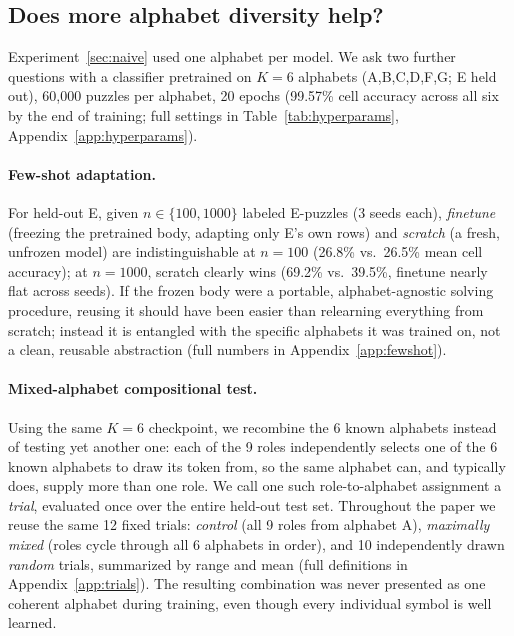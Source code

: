 \documentclass{article} %
\begin{document}
\subsection{Does more alphabet diversity help?}
\label{sec:diversity1}

Experiment~\ref{sec:naive} used one alphabet per model. We ask two
further questions with a classifier pretrained on $K=6$ alphabets
(A,B,C,D,F,G; E held out), 60{,}000 puzzles per alphabet, 20 epochs
(99.57\% cell accuracy across all six by the end of training; full
settings in Table~\ref{tab:hyperparams}, Appendix~\ref{app:hyperparams}).

\paragraph{Few-shot adaptation.} For held-out E, given $n \in \{100,
1000\}$ labeled E-puzzles (3 seeds each), \emph{finetune} (freezing the
pretrained body, adapting only E's own rows) and \emph{scratch} (a
fresh, unfrozen model) are indistinguishable at $n=100$ (26.8\% vs.\
26.5\% mean cell accuracy); at $n=1000$, scratch clearly wins (69.2\%
vs.\ 39.5\%, finetune nearly flat across seeds). If the frozen body were
a portable, alphabet-agnostic solving procedure, reusing it should have
been easier than relearning everything from scratch; instead it is
entangled with the specific alphabets it was trained on, not a clean,
reusable abstraction (full numbers in Appendix~\ref{app:fewshot}).

\paragraph{Mixed-alphabet compositional test.} Using the same $K=6$
checkpoint, we recombine the 6 known alphabets instead of testing yet
another one: each of the 9 roles independently selects one of the 6
known alphabets to draw its token from, so the same alphabet can, and
typically does, supply more than one role. We call one such
role-to-alphabet assignment a \emph{trial}, evaluated once over the
entire held-out test set. Throughout the paper we reuse the same 12
fixed trials: \emph{control} (all 9 roles from alphabet A),
\emph{maximally mixed} (roles cycle through all 6 alphabets in order),
and 10 independently drawn \emph{random} trials, summarized by range and
mean (full definitions in Appendix~\ref{app:trials}). The resulting
combination was never presented as one coherent alphabet during
training, even though every individual symbol is well learned.
\end{document}
